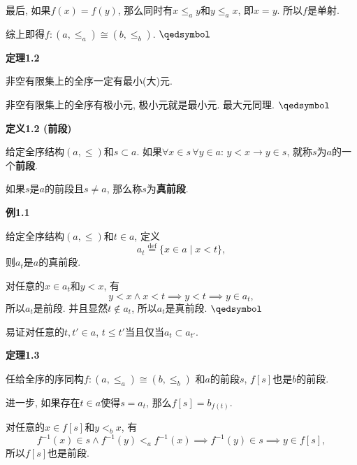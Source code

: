 \documentclass[UTF8]{ctexart}
\begin{document}
最后, 如果$f(x)=f(y)$, 那么同时有$x\leqslant_ay$和$y\leqslant_ax$,
即$x=y$. 所以$f$是单射.

综上即得$f:(a,\leqslant_a)\cong(b,\leqslant_b)$. {\hfill $\qedsymbol$}

\vspace{10pt}

\hypertarget{sec:定理1.2}{}
\noindent\textbf{定理1.2}

非空有限集上的全序一定有最小(大)元.


非空有限集上的全序有极小元, 极小元就是最小元. 最大元同理. \hfill $\qedsymbol$





\newpage

\hypertarget{sec:定义1.2}{}
\noindent\textbf{定义1.2 (前段)}

给定全序结构$(a,\leqslant)$和$s\subset a$.
如果$\forall x\in s\,\forall y\in a:\,y<x\to y\in s$,
就称$s$为$a$的一个\textbf{前段}.

如果$s$是$a$的前段且$s\neq a$, 那么称$s$为\textbf{真前段}.

\vspace{10pt}

\hypertarget{sec:例1.1}{}
\noindent\textbf{例1.1}

给定全序结构$(a,\leqslant)$和$t\in a$, 定义
\[
    a_t\overset{\mathrm{def}}{=}\{x\in a\mid x<t\},
\]
则$a_t$是$a$的真前段.


对任意的$x\in a_t$和$y<x$, 有
\[
    y<x\land x<t\implies y<t\implies y\in a_t,
\]
所以$a_t$是前段. 并且显然$t\notin a_t$, 所以$a_t$是真前段. \hfill $\qedsymbol$

\vspace{10pt}

易证对任意的$t,t'\in a$, $t\leqslant t'$当且仅当$a_t\subset a_{t'}$.

\vspace{10pt}

\hypertarget{sec:定理1.3}{}
\noindent\textbf{定理1.3}

任给全序的序同构$f:(a,\leqslant_a)\cong(b,\leqslant_b)$
和$a$的前段$s$, $f[s]$也是$b$的前段.

进一步, 如果存在$t\in a$使得$s=a_t$, 那么$f[s]=b_{f(t)}$.


对任意的$x\in f[s]$和$y<_bx$, 有
\[
    f^{-1}(x)\in s\land f^{-1}(y)<_{a} f^{-1}(x)\implies
    f^{-1}(y)\in s\implies y\in f[s],
\]
所以$f[s]$也是前段.
\end{document}
